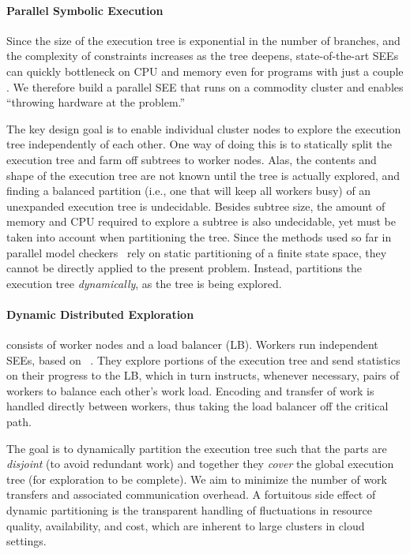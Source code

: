 \paragraph{Parallel Symbolic Execution}

Since the size of the execution tree is exponential in the number of branches, and the complexity of constraints increases as the tree deepens, state-of-the-art SEEs can quickly bottleneck on CPU and memory even for programs with just a couple \kloc.  We therefore build a parallel SEE that runs on a commodity cluster and enables ``throwing hardware at the problem.''

The key design goal is to enable individual cluster nodes to explore the execution tree independently of each other.  One way of doing this is to statically split the execution tree and farm off subtrees to worker nodes.  Alas, the contents and shape of the execution tree are not known until the tree is actually explored, and finding a balanced partition (i.e., one that will keep all workers busy) of an unexpanded execution tree is undecidable.  Besides subtree size, the amount of  memory and CPU required to explore a subtree is also undecidable, yet must be taken into account when partitioning the tree. Since the methods used so far in parallel model checkers~\cite{swarm,spin:multicore-modelchecking} rely on static partitioning of a finite state space, they cannot be directly applied to the present problem. Instead, \cnine partitions the execution tree {\em dynamically}, as the tree is being explored. 

\paragraph{Dynamic Distributed Exploration}

\cnine consists of wor\-ker nodes and a load balancer (LB).  Workers run independent SEEs, based on \klee~\cite{klee}.  They explore portions of the execution tree and send statistics on their progress to the LB, which in turn instructs, whenever necessary, pairs of workers to balance each other's work load.  Encoding and transfer of work is handled directly between workers, thus taking the load balancer off the critical path.

The goal is to dynamically partition the execution tree such that the parts are {\em disjoint} (to avoid redundant work) and together they {\em cover} the global execution tree (for exploration to be complete).  We aim to minimize the number of work transfers and associated communication overhead.  A fortuitous side effect of dynamic partitioning is the transparent handling of fluctuations in resource quality, availability, and cost, which are inherent to large clusters in cloud settings.

